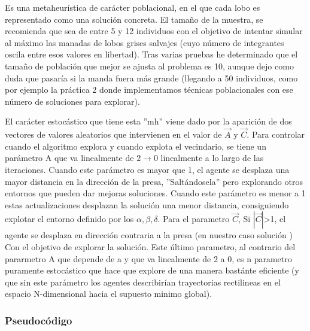 \documentclass[a4paper]{report}
\begin{document}
Es una metaheurística de carácter poblacional, en el que cada lobo es representado como una solución concreta. El tamaño de la muestra, se recomienda que sea de entre 5 y 12 individuos con el objetivo de intentar simular al máximo las manadas de lobos grises salvajes (cuyo número de integrantes oscila entre esos valores en libertad). Tras varias pruebas he determinado que el tamaño de población que mejor se ajusta al problema es 10, aunque dejo como duda que pasaría si la manda fuera más grande (llegando a 50 individuos, como por ejemplo la práctica 2 donde implementamos técnicas poblacionales con ese número de soluciones para explorar).


El carácter estocástico que tiene esta ''mh'' viene dado por la aparición de dos vectores de valores aleatorios que intervienen en el valor de $\vec{A}$ y $\vec{C}$. Para controlar cuando el algoritmo explora y cuando explota el vecindario, se tiene un parámetro A que va linealmente de $2 \rightarrow 0$ linealmente a lo largo de las iteraciones. Cuando este parámetro es mayor que 1, el agente se desplaza una mayor distancia en la dirección de la presa, ''Saltándosela'' pero explorando otros entornos que pueden dar mejoras soluciones. Cuando este parámetro es menor a 1 estas actualizaciones desplazan la solución una menor distancia, consiguiendo explotar el entorno definido por los $\alpha,\beta,\delta$. Para el parametro $\vec{C}$, Si $|\vec{C}|$>1, el agente se desplaza en dirección contraria a la presa (en nuestro caso solución ) Con el objetivo de explorar la solución. Este último parametro, al contrario del pararmetro A que depende de a y que va linealmente de 2 a 0, es n parametro puramente estocástico que hace que explore de una manera bastánte eficiente (y que sin este parámetro los agentes describirían trayectorias rectilineas en el espacio N-dimensional hacia el supuesto minimo global).


\subsubsection*{Pseudocódigo}
\end{document}
